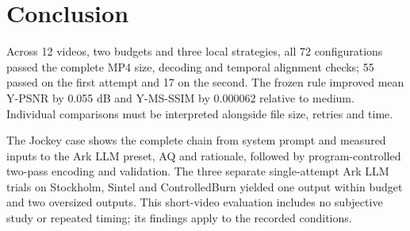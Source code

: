\documentclass[conference]{IEEEtran}
\begin{document}
\section{Conclusion}
Across 12 videos, two budgets and three local strategies, all 72 configurations passed the complete MP4 size, decoding and temporal alignment checks; 55 passed on the first attempt and 17 on the second. The frozen rule improved mean Y-PSNR by 0.055 dB and Y-MS-SSIM by 0.000062 relative to medium. Individual comparisons must be interpreted alongside file size, retries and time.

The Jockey case shows the complete chain from system prompt and measured inputs to the Ark LLM preset, AQ and rationale, followed by program-controlled two-pass encoding and validation. The three separate single-attempt Ark LLM trials on Stockholm, Sintel and ControlledBurn yielded one output within budget and two oversized outputs. This short-video evaluation includes no subjective study or repeated timing; its findings apply to the recorded conditions.
\end{document}
